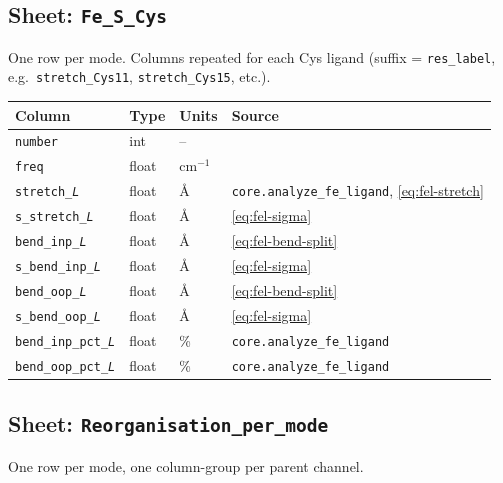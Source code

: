 \documentclass[10pt,a4paper,twoside]{article}
\newcommand{\fn}[1]{\texttt{#1}}
\begin{document}
\subsection{Sheet: \texttt{Fe\_S\_Cys}}

One row per mode. Columns repeated for each Cys ligand
(suffix = \texttt{res\_label}, e.g.\ \texttt{stretch\_Cys11},
\texttt{stretch\_Cys15}, etc.).

\begin{longtable}{p{} p{} p{} p{}}
\toprule
\textbf{Column} & \textbf{Type} & \textbf{Units} & \textbf{Source} \\
\midrule
\texttt{number}              & int    & --     & \\
\texttt{freq}                & float  & cm$^{-1}$ & \\
\texttt{stretch\_\textit{L}} & float  & \AA{}  & \fn{core.analyze\_fe\_ligand}, \cref{eq:fel-stretch} \\
\texttt{s\_stretch\_\textit{L}} & float & \AA{} & \cref{eq:fel-sigma} \\
\texttt{bend\_inp\_\textit{L}}  & float  & \AA{}  & \cref{eq:fel-bend-split} \\
\texttt{s\_bend\_inp\_\textit{L}}  & float  & \AA{}  & \cref{eq:fel-sigma} \\
\texttt{bend\_oop\_\textit{L}}  & float  & \AA{}  & \cref{eq:fel-bend-split} \\
\texttt{s\_bend\_oop\_\textit{L}}  & float  & \AA{}  & \cref{eq:fel-sigma} \\
\texttt{bend\_inp\_pct\_\textit{L}} & float  & \%   & \fn{core.analyze\_fe\_ligand} \\
\texttt{bend\_oop\_pct\_\textit{L}} & float  & \%   & \fn{core.analyze\_fe\_ligand} \\
\bottomrule
\end{longtable}

\subsection{Sheet: \texttt{Reorganisation\_per\_mode}}

One row per mode, one column-group per parent channel.
\end{document}
